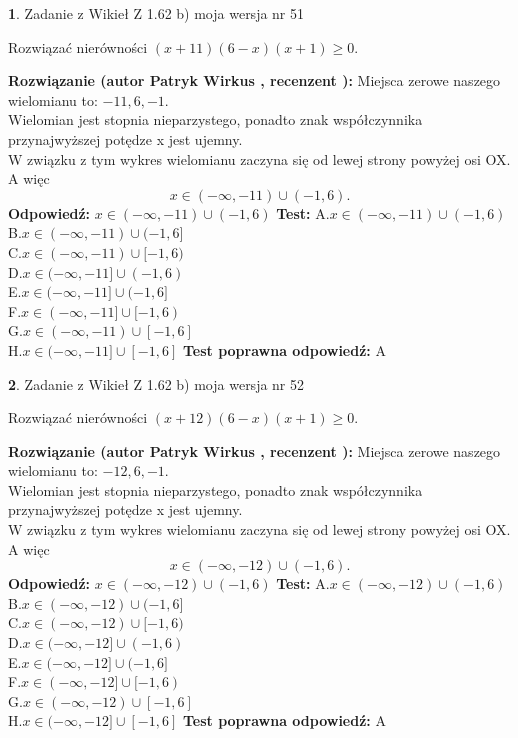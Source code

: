 \documentclass[12pt, a4paper]{article}
\theoremstyle{definition} %
\newtheorem{zad}{}
\newcommand{\zadStart}[1]{\begin{zad}#1\newline}
\newcommand{\zadStop}{\end{zad}}
\newcommand{\rozwStart}[2]{\noindent \textbf{Rozwiązanie (autor #1 , recenzent #2): }\newline}
\newcommand{\rozwStop}{\newline}
\newcommand{\odpStart}{\noindent \textbf{Odpowiedź:}\newline}
\newcommand{\odpStop}{\newline}
\newcommand{\testStart}{\noindent \textbf{Test:}\newline}
\newcommand{\testStop}{\newline}
\newcommand{\kluczStart}{\noindent \textbf{Test poprawna odpowiedź:}\newline}
\newcommand{\kluczStop}{\newline}
\begin{document}
\zadStart{Zadanie z Wikieł Z 1.62 b) moja wersja nr 51}

Rozwiązać nierówności $(x+11)(6-x)(x+1)\ge0$.
\zadStop
\rozwStart{Patryk Wirkus}{}
Miejsca zerowe naszego wielomianu to: $-11, 6, -1$.\\
Wielomian jest stopnia nieparzystego, ponadto znak współczynnika przy\linebreak najwyższej potędze x jest ujemny.\\ W związku z tym wykres wielomianu zaczyna się od lewej strony powyżej osi OX. A więc $$x \in (-\infty,-11) \cup (-1,6).$$
\rozwStop
\odpStart
$x \in (-\infty,-11) \cup (-1,6)$
\odpStop
\testStart
A.$x \in (-\infty,-11) \cup (-1,6)$\\
B.$x \in (-\infty,-11) \cup (-1,6]$\\
C.$x \in (-\infty,-11) \cup [-1,6)$\\
D.$x \in (-\infty,-11] \cup (-1,6)$\\
E.$x \in (-\infty,-11] \cup (-1,6]$\\
F.$x \in (-\infty,-11] \cup [-1,6)$\\
G.$x \in (-\infty,-11) \cup [-1,6]$\\
H.$x \in (-\infty,-11] \cup [-1,6]$
\testStop
\kluczStart
A
\kluczStop



\zadStart{Zadanie z Wikieł Z 1.62 b) moja wersja nr 52}

Rozwiązać nierówności $(x+12)(6-x)(x+1)\ge0$.
\zadStop
\rozwStart{Patryk Wirkus}{}
Miejsca zerowe naszego wielomianu to: $-12, 6, -1$.\\
Wielomian jest stopnia nieparzystego, ponadto znak współczynnika przy\linebreak najwyższej potędze x jest ujemny.\\ W związku z tym wykres wielomianu zaczyna się od lewej strony powyżej osi OX. A więc $$x \in (-\infty,-12) \cup (-1,6).$$
\rozwStop
\odpStart
$x \in (-\infty,-12) \cup (-1,6)$
\odpStop
\testStart
A.$x \in (-\infty,-12) \cup (-1,6)$\\
B.$x \in (-\infty,-12) \cup (-1,6]$\\
C.$x \in (-\infty,-12) \cup [-1,6)$\\
D.$x \in (-\infty,-12] \cup (-1,6)$\\
E.$x \in (-\infty,-12] \cup (-1,6]$\\
F.$x \in (-\infty,-12] \cup [-1,6)$\\
G.$x \in (-\infty,-12) \cup [-1,6]$\\
H.$x \in (-\infty,-12] \cup [-1,6]$
\testStop
\kluczStart
A
\kluczStop
\end{document}
